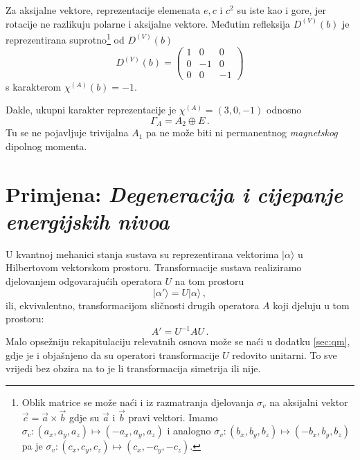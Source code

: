 Za aksijalne vektore, reprezentacije elemenata $e, c$ i $c^2$ su iste kao i
gore, jer rotacije ne razlikuju polarne i aksijalne vektore. 
Međutim refleksija $D^{(V)}(b)$ je reprezentirana
suprotno\footnote{Oblik matrice se može naći i iz razmatranja djelovanja $\sigma_{v}$ na
aksijalni vektor $\vec{c}=\vec{a}\times\vec{b}$ gdje 
su $\vec{a}$ i $\vec{b}$ pravi
vektori. Imamo $\sigma_{v}:(a_x, a_y, a_z)\mapsto (-a_x, a_y, a_z)$ i
 analogno $\sigma_{v}:(b_x, b_y, b_z)\mapsto (-b_x, b_y, b_z)$ pa je
 $\sigma_{v}:(c_x, c_y, c_z)\mapsto (c_x, -c_y, -c_z)$.} 
od $D^{(V)}(b)$
\begin{displaymath}
D^{(V)}(b)=
\begin{pmatrix}
1 & 0 & 0 \\
0 & -1 & 0 \\
0 & 0 & -1
\end{pmatrix}
\end{displaymath}
s karakterom $\chi^{(A)}(b)=-1$.

Dakle, ukupni karakter reprezentacije je $\chi^{(A)}=(3, 0, -1)$ odnosno
\begin{displaymath}
      \Gamma_{A} = A_2 \oplus E \,.
\end{displaymath}
Tu se ne pojavljuje trivijalna $A_1$ pa ne može biti ni permanentnog \emph{magnetskog}
dipolnog momenta.

\section{Primjena: \emph{Degeneracija i cijepanje energijskih nivoa}}
\label{sec:degeneracija}

U kvantnoj mehanici stanja sustava su reprezentirana vektorima
$|\alpha\rangle$ u Hilbertovom vektorskom prostoru. Transformacije
sustava realiziramo djelovanjem odgovarajućih operatora $U$ na tom prostoru
\begin{equation}
 |\alpha'\rangle = U |\alpha\rangle \,,
\end{equation}
ili, ekvivalentno, transformacijom sličnosti drugih 
operatora $A$ koji djeluju u tom prostoru:
\begin{equation}
   A' = U^{-1} A U \,.
\end{equation}
Malo opsežniju rekapitulaciju relevatnih osnova može se naći u dodatku
\ref{sec:qm}, gdje je i objašnjeno da su operatori transformacije $U$
redovito unitarni. To sve vrijedi bez obzira na to je li transformacija
simetrija ili nije.

